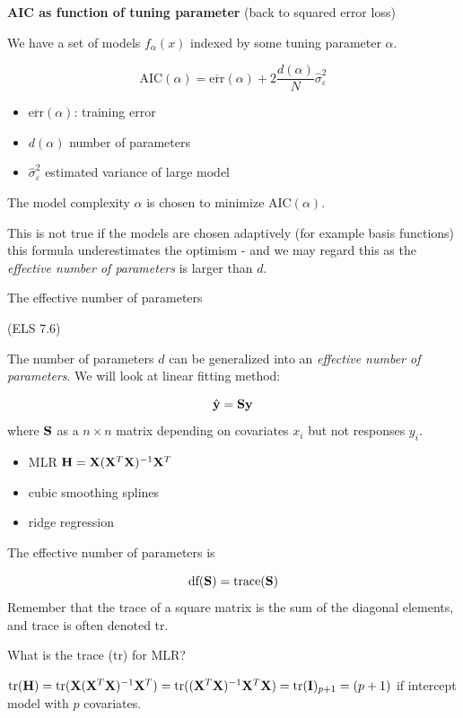 \documentclass[
  ignorenonframetext,
]{beamer}
\providecommand{\tightlist}{%
  \setlength{\itemsep}{0pt}\setlength{\parskip}{0pt}}
\begin{document}
\begin{frame}

\textbf{AIC as function of tuning parameter} (back to squared error
loss)

We have a set of models \(f_{\alpha}(x)\) indexed by some tuning
parameter \(\alpha\).

\[\text{AIC}(\alpha)=\overline{\text{err}}(\alpha)+2 \frac{d(\alpha)}{N}\hat{\sigma}_{\varepsilon}^2\]

\begin{itemize}
\tightlist
\item
  \(\overline{\text{err}}(\alpha)\): training error
\item
  \(d(\alpha)\) number of parameters
\item
  \(\hat{\sigma}_{\varepsilon}^2\) estimated variance of large model
\end{itemize}

The model complexity \(\alpha\) is chosen to minimize
\(\text{AIC}(\alpha)\).

This is not true if the models are chosen adaptively (for example basis
functions) this formula underestimates the optimism - and we may regard
this as the \emph{effective number of parameters} is larger than \(d\).

\end{frame}

\begin{frame}

\begin{block}{The effective number of parameters}

(ELS 7.6)

The number of parameters \(d\) can be generalized into an
\emph{effective number of parameters}. We will look at linear fitting
method:

\[ \hat{\bf y}={\bf Sy}\] where \({\bf S}\) as a \(n \times n\) matrix
depending on covariates \(x_i\) but not responses \(y_i\).

\begin{itemize}
\tightlist
\item
  MLR \({\bf H}={\bf X}({\bf X}^T{\bf X})^{-1}{\bf X}^T\)
\item
  cubic smoothing splines
\item
  ridge regression
\end{itemize}

The effective number of parameters is

\[\text{df}({\bf S})=\text{trace}({\bf S})\] Remember that the trace of
a square matrix is the sum of the diagonal elements, and trace is often
denoted tr.

What is the trace (tr) for MLR?

\(\text{tr}({\bf H})=\text{tr}({\bf X}({\bf X}^T{\bf X})^{-1}{\bf X}^T)=\text{tr}(({\bf X}^T{\bf X})^{-1}{\bf X}^T{\bf X})=\text{tr}({\bf I})_{p+1}=(p+1)\)
if intercept model with \(p\) covariates.

\end{block}

\end{frame}
\end{document}
